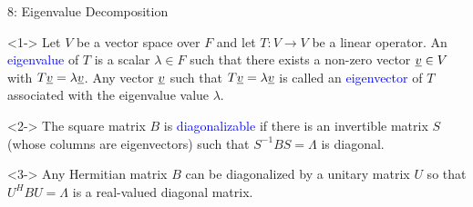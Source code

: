 \documentclass[10pt,letterpaper,english]{beamer}
\begin{document}
\begin{frame}{8: Eigenvalue Decomposition}

\begin{definition}<1->
Let $V$ be a vector space over $F$ and let $T\colon V \to V$ be a linear operator.
An \textcolor{blue}{eigenvalue} of $T$ is a scalar $\lambda \in F$ such that there exists a non-zero vector $\underline{v} \in V$ with $T \underline{v} = \lambda \underline{v}$.
Any vector $\underline{v}$ such that $T \underline{v} = \lambda \underline{v}$ is called an \textcolor{blue}{eigenvector} of $T$ associated with the eigenvalue value $\lambda$.
\end{definition}

\begin{definition}<2->
The square matrix $B$ is \textcolor{blue}{diagonalizable} if there is an invertible matrix $S$ (whose columns are eigenvectors) such that $S^{-1} B S = \Lambda$ is diagonal.
\end{definition}



\begin{theorem}<3->
Any Hermitian matrix $B$ can be diagonalized by a unitary matrix $U$ so that $U^H B U = \Lambda$ is a real-valued diagonal matrix.
\end{theorem}

\vspace{2mm}


\end{frame}
\end{document}
